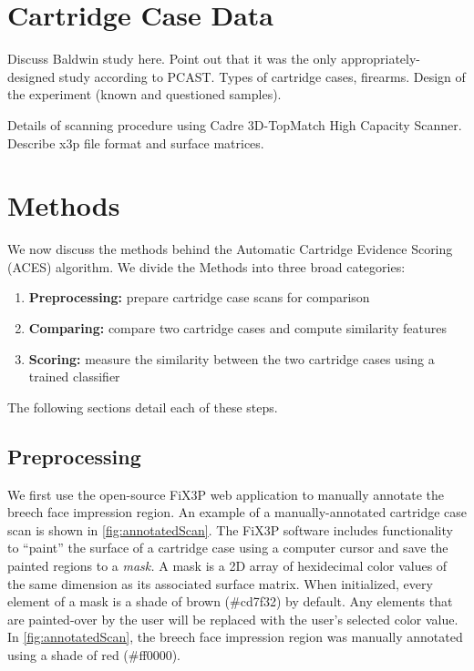 \documentclass[
]{jdssv}
\begin{document}
\hypertarget{cartridge-case-data}{%
\section{Cartridge Case Data}\label{cartridge-case-data}}

Discuss Baldwin study here. Point out that it was the only
appropriately-designed study according to PCAST. Types of cartridge
cases, firearms. Design of the experiment (known and questioned
samples).

Details of scanning procedure using Cadre 3D-TopMatch High Capacity
Scanner. Describe x3p file format and surface matrices.

\hypertarget{methods}{%
\section{Methods}\label{methods}}

We now discuss the methods behind the Automatic Cartridge Evidence
Scoring (ACES) algorithm. We divide the Methods into three broad
categories:

\begin{enumerate}
\item \textbf{Preprocessing:} prepare cartridge case scans for comparison

\item \textbf{Comparing:} compare two cartridge cases and compute similarity features

\item \textbf{Scoring:} measure the similarity between the two cartridge cases using a trained classifier
\end{enumerate}

The following sections detail each of these steps.

\hypertarget{preprocessing}{%
\subsection{Preprocessing}\label{preprocessing}}

We first use the open-source FiX3P web application to manually annotate
the breech face impression region. An example of a manually-annotated
cartridge case scan is shown in \autoref{fig:annotatedScan}. The FiX3P
software includes functionality to ``paint'' the surface of a cartridge
case using a computer cursor and save the painted regions to a
\emph{mask.} A mask is a 2D array of hexidecimal color values of the
same dimension as its associated surface matrix. When initialized, every
element of a mask is a shade of brown (\#cd7f32) by default. Any
elements that are painted-over by the user will be replaced with the
user's selected color value. In \autoref{fig:annotatedScan}, the breech
face impression region was manually annotated using a shade of red
(\#ff0000).
\end{document}
